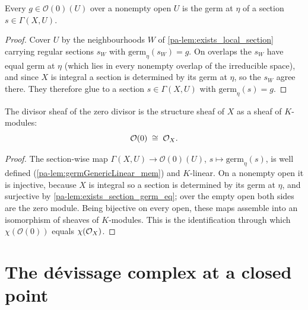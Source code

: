 \begin{lemma}
  \label{pa-lem:exists_section_germ_eq}
  \leanok

  Every \(g \in \mathcal O(0)(U)\) over a nonempty open \(U\) is the germ at \(\eta\) of a section
  \(s \in \Gamma(X, U)\).
\end{lemma}
\begin{proof}
  \leanok
  Cover \(U\) by the neighbourhoods \(W\) of \ref{pa-lem:exists_local_section} carrying regular
  sections \(s_W\) with \(\mathrm{germ}_\eta(s_W) = g\). On overlaps the \(s_W\) have equal germ at
  \(\eta\) (which lies in every nonempty overlap of the irreducible space), and since \(X\) is
  integral a section is determined by its germ at \(\eta\), so the \(s_W\) agree there. They
  therefore glue to a section \(s \in \Gamma(X, U)\) with \(\mathrm{germ}_\eta(s) = g\).
\end{proof}

\begin{theorem}
  \label{pa-thm:divisorSheafZeroIso}
  \leanok

  The divisor sheaf of the zero divisor is the structure sheaf of \(X\) as a sheaf of \(K\)-modules:
  \[
    \mathcal O(0) \;\cong\; \mathcal{O}_{X} .
  \]
\end{theorem}
\begin{proof}
  \leanok
  The section-wise map \(\Gamma(X, U) \to \mathcal O(0)(U)\), \(s \mapsto \mathrm{germ}_\eta(s)\), is
  well defined (\ref{pa-lem:germGenericLinear_mem}) and \(K\)-linear. On a nonempty open it is
  injective, because \(X\) is integral so a section is determined by its germ at \(\eta\), and
  surjective by \ref{pa-lem:exists_section_germ_eq}; over the empty open both sides are the zero module.
  Being bijective on every open, these maps assemble into an isomorphism of sheaves of \(K\)-modules.
  This is the identification through which \(\chi(\mathcal O(0))\) equals \(\chi(\mathcal{O}_{X})\).
\end{proof}

\section{The dévissage complex at a closed point}

